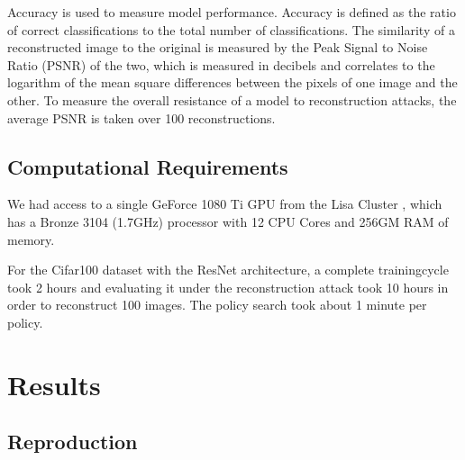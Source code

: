 Accuracy is used to measure model performance. Accuracy is defined as the ratio of correct classifications to the total number of classifications. The similarity of a reconstructed image to the original is measured by the Peak Signal to Noise Ratio (PSNR) \cite{hore2010image} of the two, which is measured in decibels and correlates to the logarithm of the mean square differences between the pixels of one image and the other. To measure the overall resistance of a model to reconstruction attacks, the average PSNR is taken over 100 reconstructions.

\subsection{Computational Requirements}
We had access to a single GeForce 1080 Ti GPU from the Lisa Cluster
\cite{lisac}, which has a Bronze 3104 (1.7GHz) processor with  12 CPU Cores and 256GM RAM of memory. %

For the Cifar100 dataset with the ResNet architecture, a complete trainingcycle took 2 hours and evaluating it under the reconstruction attack took 10 hours in order to reconstruct 100 images. The policy search took about 1 minute per policy.


\section{Results}

\subsection{Reproduction}

